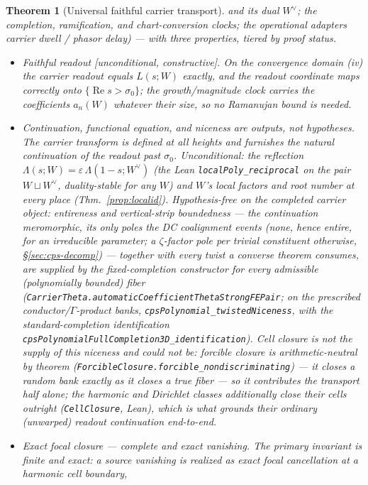 \documentclass[11pt]{article}
\newtheorem{theorem}{Theorem}
\theoremstyle{definition}
\renewcommand{\Re}{\operatorname{Re}}
\begin{document}
\begin{theorem}[Universal faithful carrier transport]
and its dual $W^\vee$; the completion, ramification, and chart-conversion clocks; the operational adapters
carrier dwell / phasor delay) --- with three properties, tiered by proof status.
\begin{itemize}
\item[\textup{(a)}] \emph{Faithful readout} \textup{[unconditional, constructive]}. On the convergence domain
\emph{(iv)} the carrier readout equals $L(s;W)$ exactly, and the readout coordinate maps correctly onto
$\{\Re s>\sigma_0\}$; the growth/magnitude clock carries the coefficients $a_n(W)$ whatever their size, so no
Ramanujan bound is needed.
\item[\textup{(b)}] \emph{Continuation, functional equation, and niceness are outputs, not hypotheses.} The
carrier transform is defined at all heights and furnishes the natural continuation of the readout past
$\sigma_0$. \emph{Unconditional}: the reflection $\Lambda(s;W)=\varepsilon\,\Lambda(1-s;W^\vee)$ (the Lean
\texttt{localPoly\_reciprocal} on the pair $W\sqcup W^\vee$, duality-stable for any $W$) and $W$'s local factors
and root number at every place (Thm.~\ref{prop:localid}). \emph{Hypothesis-free on the completed
carrier object}: entireness and vertical-strip boundedness --- the continuation meromorphic, its
only poles the DC coalignment events (none, hence entire, for an irreducible parameter; a
$\zeta$-factor pole per trivial constituent otherwise, \S\ref{sec:cps-decomp}) --- together with
every twist a converse theorem consumes, are supplied by the fixed-completion constructor for
every admissible (polynomially bounded) fiber
(\texttt{CarrierTheta.automaticCoefficientThetaStrongFEPair}; on the prescribed
conductor/$\Gamma$-product banks, \texttt{cpsPolynomial\_twistedNiceness}, with the
standard-completion identification \texttt{cpsPolynomialFullCompletion3D\_identification}).
Cell closure is \emph{not} the supply of this niceness and could not be: forcible closure is
arithmetic-neutral by theorem
(\texttt{ForcibleClosure.forcible\_nondiscriminating}) --- it closes a random bank exactly as it
closes a true fiber --- so it contributes the transport half alone; the harmonic and Dirichlet
classes additionally close their cells outright (\texttt{CellClosure}, Lean), which is what
grounds their \emph{ordinary} (unwarped) readout continuation end-to-end.
\item[\textup{(c)}] \emph{Exact focal closure --- complete and exact vanishing.} The primary invariant is finite
and exact: a source vanishing is realized as \emph{exact focal cancellation} at a harmonic cell boundary,

\end{itemize}
\end{theorem}
\end{document}

